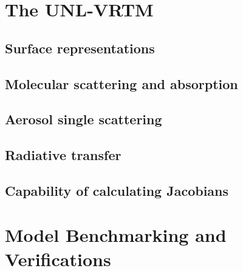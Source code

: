 \section{The UNL-VRTM}

\subsection{Surface representations}

\subsection{Molecular scattering and absorption}

\subsection{Aerosol single scattering}

\subsection{Radiative transfer}

\subsection{Capability of calculating Jacobians}

\section{Model Benchmarking and Verifications}
